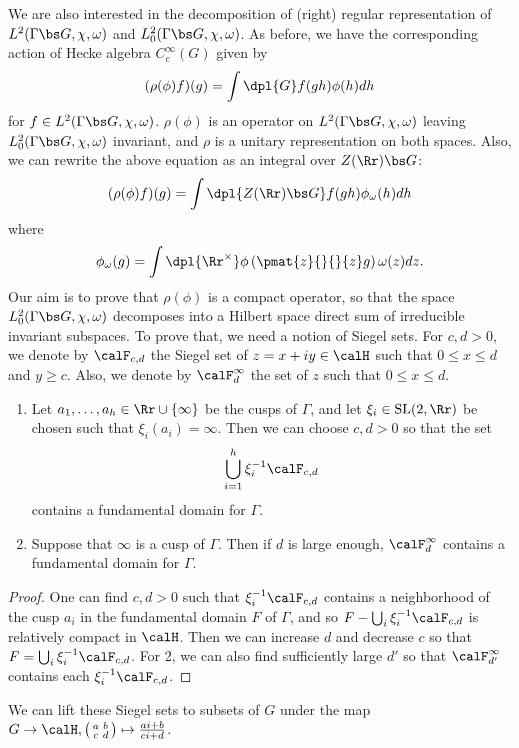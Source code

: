 We are also interested in the decomposition of (right) regular representation of $L^{2}(\Gamma \bs G, \chi, \omega)$ and $L_{0}^{2}(\Gamma \bs G, \chi, \omega)$. 
As before, we have the corresponding action of Hecke algebra $C_{c}^{\infty}(G)$ given by 
$$
(\rho(\phi)f)(g) = \int\dpl{G} f(gh)\phi(h)dh
$$
for $f\in L^{2}(\Gamma \bs G, \chi, \omega)$. 
$\rho(\phi)$ is an operator on $L^{2}(\Gamma \bs G,\chi, \omega)$ leaving $L^{2}_{0}(\Gamma \bs G, \chi, \omega)$ invariant, and $\rho$ is a unitary representation on both spaces. 
Also, we can rewrite the above equation as an integral over $Z(\Rr)\bs G$:
$$
(\rho(\phi)f)(g) = \int\dpl{Z(\Rr)\bs G} f(gh)\phi_{\omega}(h) dh
$$
where 
$$
\phi_{\omega}(g) = \int\dpl{\Rr^{\times}} \phi\left( \pmat{z}{}{}{z} g\right) \omega(z)dz.
$$
Our aim is to prove that $\rho(\phi)$ is a compact operator, so that the space $L^{2}_{0}(\Gamma \bs G, \chi, \omega)$ decomposes into a Hilbert space direct sum of irreducible invariant subspaces. 
To prove that, we need a notion of Siegel sets. 
For $c, d>0$, we denote by $\calF_{c, d}$ the Siegel set of $z = x+iy\in \calH$ such that $0\leq x\leq d$ and $y\geq c$. 
Also, we denote by $\calF_{d}^{\infty}$ the set of $z$ such that $0\leq x\leq d$. 
\begin{proposition}
\label{siegel}
\begin{enumerate}
\item Let $a_{1}, \dots, a_{h}\in \Rr\cup \{\infty\}$ be the cusps of $\Gamma$, and let $\xi_{i}\in \SL(2, \Rr)$ be chosen such that $\xi_{i}(a_{i}) = \infty$. 
Then we can choose $c, d>0$ so that the set 
$$
\bigcup_{i = 1}^{h} \xi_{i}^{-1}\calF_{c, d}
$$
contains a fundamental domain for $\Gamma$. 
\item Suppose that $\infty$ is a cusp of $\Gamma$. Then if $d$ is large enough, $\calF_{d}^{\infty}$ contains a fundamental domain for $\Gamma$. 
\end{enumerate}
\end{proposition}
\begin{proof}
One can find $c, d>0$ such that $\xi_{i}^{-1}\calF_{c, d}$ contains a neighborhood of the cusp $a_i$ in the fundamental domain $F$ of $\Gamma$, and so $F - \bigcup_{i} \xi_{i}^{-1}\calF_{c, d}$ is relatively compact in $\calH$. 
Then we can increase $d$ and decrease $c$ so that $F = \bigcup_{i} \xi_{i}^{-1} \calF_{c, d}$. 
For 2, we can also find sufficiently large $d'$ so that $\calF_{d'}^{\infty}$ contains each $\xi_{i}^{-1}\calF_{c, d}$. 
\end{proof}
We can lift these Siegel sets to subsets of $G$ under the map $G\to \calH, \smat{a}{b}{c}{d}\mapsto \frac{ai+b}{ci+d}$. 
